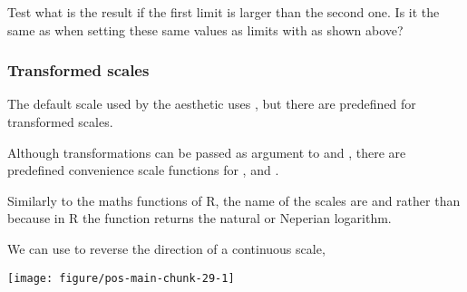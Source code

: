 \documentclass[krantz2]{krantz}\usepackage{knitr}%
\begin{document}
\begin{playground}
Test what is the result if the first limit is larger than the second one. Is it the same as when setting these same values as limits with  as shown above?

\begin{knitrout}\footnotesize
{}\color{fgcolor}\begin{kframe}
\begin{alltt}
  \hlopt{+} \hlstd{()} \hlopt{+}
  \hlstd{(} \hlstd{=} \hlstd{(}\hlstd{,} \hlstd{))}
\end{alltt}
\end{kframe}
\end{knitrout}
\end{playground}

\subsubsection{Transformed scales}

The default scale used by the  aesthetic uses , but there are predefined for transformed scales.

Although transformations can be passed as argument to  and , there are predefined convenience scale functions for ,  and .

\begin{warningbox}
  Similarly to the maths functions of R, the name of the scales are  and  rather than  because in R the function  returns the natural or Neperian logarithm.
\end{warningbox}

We can use  to reverse the direction of a continuous scale,

\begin{knitrout}\footnotesize
{}\color{fgcolor}\begin{kframe}
\begin{alltt}
  \hlopt{+} \hlstd{()} \hlopt{+} \hlstd{()}
\end{alltt}
\end{kframe}

{\centering \texttt{[image: figure/pos-main-chunk-29-1]} 

}



\end{knitrout}
\end{document}

